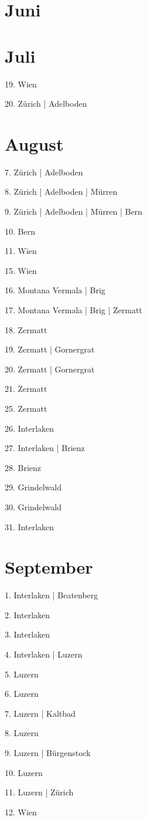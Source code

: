 \documentclass[twoside=false,titlepage=false,open=any, parskip=never, fontsize=10pt, headings=small, chapterprefix=false, appendixprefix=false, DIV=15]{scrbook}
\begin{document}
\begin{multicols}{3}
            \section*{Juni}
            \section*{Juli}
            19. Wien\par
            20. Zürich | Adelboden\par
            \section*{August}
            7. Zürich | Adelboden\par
            8. Zürich | Adelboden | Mürren\par
            9. Zürich | Adelboden | Mürren | Bern\par
            10. Bern\par
            11. Wien\par
            15. Wien\par
            16. Montana Vermala | Brig\par
            17. Montana Vermala | Brig | Zermatt\par
            18. Zermatt\par
            19. Zermatt | Gornergrat\par
            20. Zermatt | Gornergrat\par
            21. Zermatt\par
            25. Zermatt\par
            26. Interlaken\par
            27. Interlaken | Brienz\par
            28. Brienz\par
            29. Grindelwald\par
            30. Grindelwald\par
            31. Interlaken\par
            \section*{September}
            1. Interlaken | Beatenberg\par
            2. Interlaken\par
            3. Interlaken\par
            4. Interlaken | Luzern\par
            5. Luzern\par
            6. Luzern\par
            7. Luzern | Kaltbad\par
            8. Luzern\par
            9. Luzern | Bürgenstock\par
            10. Luzern\par
            11. Luzern | Zürich\par
            12. Wien\par

\end{multicols}
\end{document}
